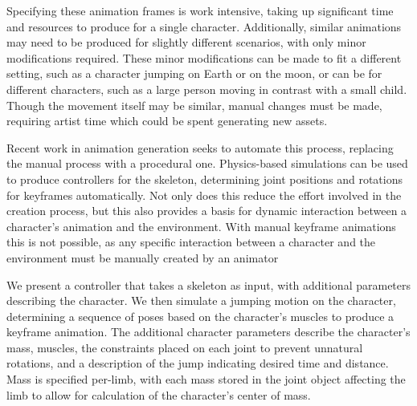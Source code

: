 Specifying these animation frames is work intensive, taking up significant time and resources to produce for a single character.  Additionally, similar animations may need to be produced for slightly different scenarios, with only minor modifications required.  These minor modifications can be made to fit a different setting, such as a character jumping on Earth or on the moon, or can be for different characters, such as a large person moving in contrast with a small child.  Though the movement itself may be similar, manual changes must be made, requiring artist time which could be spent generating new assets.  

Recent work in animation generation seeks to automate this process, replacing the manual process with a procedural one.  Physics-based simulations can be used to produce controllers for the skeleton, determining joint positions and rotations for keyframes automatically.  Not only does this reduce the effort involved in the creation process, but this also provides a basis for dynamic interaction between a character's animation and the environment.  With manual keyframe animations this is not possible, as any specific interaction between a character and the environment must be manually created by an animator 

We present a controller that takes a skeleton as input, with additional parameters describing the character.  We then simulate a jumping motion on the character, determining a sequence of poses based on the character's muscles to produce a keyframe animation.  The additional character parameters describe the character's mass, muscles, the constraints placed on each joint to prevent unnatural rotations, and a description of the jump indicating desired time and distance.  Mass is specified per-limb, with each mass stored in the joint object affecting the limb to allow for calculation of the character's center of mass.  

\newcommand{\frameimage}[1]{\fbox{\texttt{[image: \#1]}}}

